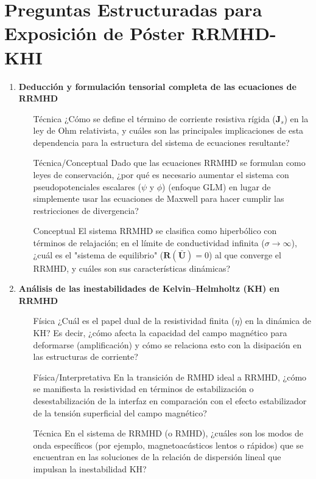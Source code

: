 
\section{Preguntas Estructuradas para Exposición de Póster RRMHD-KHI}

\begin{enumerate}

    \item \textbf{Deducción y formulación tensorial completa de las ecuaciones de RRMHD}
    \begin{itemize}
        \item [Técnica] ¿Cómo se define el término de corriente resistiva rígida ($\mathbf{J}_s$) en la ley de Ohm relativista, y cuáles son las principales implicaciones de esta dependencia para la estructura del sistema de ecuaciones resultante? \cite{332, 409}
        \item [Técnica/Conceptual] Dado que las ecuaciones RRMHD se formulan como leyes de conservación, ¿por qué es necesario aumentar el sistema con pseudopotenciales escalares ($\psi$ y $\phi$) (enfoque GLM) en lugar de simplemente usar las ecuaciones de Maxwell para hacer cumplir las restricciones de divergencia? \cite{332, 381, 389, 407}
        \item [Conceptual] El sistema RRMHD se clasifica como hiperbólico con términos de relajación; en el límite de conductividad infinita ($\sigma \to \infty$), ¿cuál es el "sistema de equilibrio" ($\mathbf{R}(\bar{\mathbf{U}}) = 0$) al que converge el RRMHD, y cuáles son sus características dinámicas? \cite{357, 358, 410}
    \end{itemize}

    \item \textbf{Análisis de las inestabilidades de Kelvin–Helmholtz (KH) en RRMHD}
    \begin{itemize}
        \item [Física] ¿Cuál es el papel dual de la resistividad finita ($\eta$) en la dinámica de KH? Es decir, ¿cómo afecta la capacidad del campo magnético para deformarse (amplificación) y cómo se relaciona esto con la disipación en las estructuras de corriente? \cite{352, 382}
        \item [Física/Interpretativa] En la transición de RMHD ideal a RRMHD, ¿cómo se manifiesta la resistividad en términos de estabilización o desestabilización de la interfaz en comparación con el efecto estabilizador de la tensión superficial del campo magnético? \cite{432, 382}
        \item [Técnica] En el sistema de RRMHD (o RMHD), ¿cuáles son los modos de onda específicos (por ejemplo, magnetoacústicos lentos o rápidos) que se encuentran en las soluciones de la relación de dispersión lineal que impulsan la inestabilidad KH? \cite{433}
    \end{itemize}


\end{enumerate}
